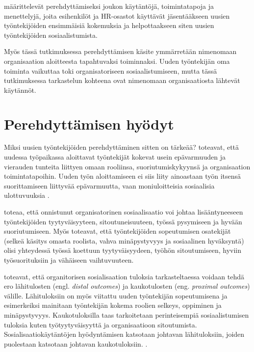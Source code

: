 \documentclass[utf8]{gradu3}
\begin{document}
\textcite{klein-polin-2012} määrittelevät perehdyttämiseksi joukon käytäntöjä, toimintatapoja ja menettelyjä, joita esihenkilöt ja HR-osastot käyttävät jäsentääkseen uusien työntekijöiden ensimmäisiä kokemuksia ja helpottaakseen siten uusien työntekijöiden sosiaalistumista.

Myös tässä tutkimuksessa perehdyttämisen käsite ymmärretään nimenomaan organisaation aloitteesta tapahtuvaksi toiminnaksi. Uuden työntekijän oma toiminta vaikuttaa toki organisatoriseen sosiaalistumiseen, mutta tässä tutkimuksessa tarkastelun kohteena ovat nimenomaan organisaatiosta lähtevät käytännöt.

\section{Perehdyttämisen hyödyt}
\label{luku-perehdyttämisen-hyödyt}

Miksi uusien työntekijöiden perehdyttäminen sitten on tärkeää? \textcite{saks-gruman-2012} toteavat, että uudessa työpaikassa aloittavat työntekijät kokevat usein epävarmuuden ja vierauden tunteita liittyen omaan rooliinsa, suoriutumiskykyynsä ja organisaation toimintatapoihin. Uuden työn aloittamiseen ei siis liity ainoastaan työn itsensä suorittamiseen liittyvää epävarmuutta, vaan moniuloitteisia sosiaalisia ulottuvuuksia \parencite{saks-gruman-2012}. 

\textcite{wanberg-2012} toteaa, että onnistunut organisatorinen sosiaalisaatio voi johtaa lisääntyneeseen työntekijöiden tyytyväisyyteen, sitoutuneisuuteen, työssä pysymiseen ja hyvään suoriutumiseen. Myös \textcite{bauer-ym-2007} toteavat, että työntekijöiden sopeutumisen osatekijät (selkeä käsitys omasta roolista, vahva minäpystyvyys ja sosiaalinen hyväksyntä) olisi yhteydessä työssä koettuun tyytyväisyydeen, työhön sitoutumiseen, hyviin työsuorituksiin ja vähäiseen vaihtuvuuteen. 

\textcite{saks-gruman-2012} toteavat, että organitorisen sosialisaation tuloksia tarkasteltaessa voidaan tehdä ero lähitulosten (engl. \textit{distal outcomes}) ja kaukotulosten (eng. \textit{proximal outcomes}) välille. Lähituloksiin on myös viitattu uuden työntekijän sopeutumisena ja esimerkeiksi mainitaan työntekijän kokema roolien selkeys, oppiminen ja minäpystyvyys. Kaukotuloksilla taas tarkoitetaan perinteisempiä sosiaalistumisen tuloksia kuten työtyytyväisyyttä ja organisaatioon sitoutumista. Sosialisaatiokäytäntöjen hyödyntämisen katsotaan johtavan lähituloksiin, joiden puolestaan katsotaan johtavan kaukotuloksiin. \parencite{saks-gruman-2012}.
\end{document}
